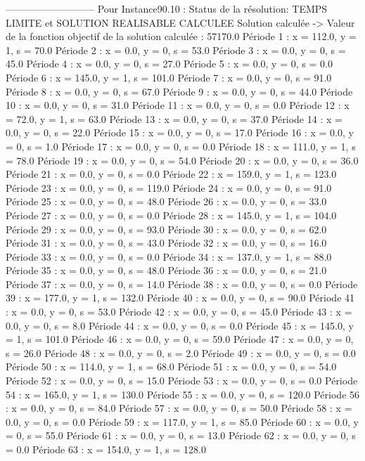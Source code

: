 ---------------------------
Pour Instance90.10 :
Status de la résolution: TEMPS LIMITE et SOLUTION REALISABLE CALCULEE
Solution calculée
-> Valeur de la fonction objectif de la solution calculée :  57170.0
Période 1 : x = 112.0, y = 1, s = 70.0
Période 2 : x = 0.0, y = 0, s = 53.0
Période 3 : x = 0.0, y = 0, s = 45.0
Période 4 : x = 0.0, y = 0, s = 27.0
Période 5 : x = 0.0, y = 0, s = 0.0
Période 6 : x = 145.0, y = 1, s = 101.0
Période 7 : x = 0.0, y = 0, s = 91.0
Période 8 : x = 0.0, y = 0, s = 67.0
Période 9 : x = 0.0, y = 0, s = 44.0
Période 10 : x = 0.0, y = 0, s = 31.0
Période 11 : x = 0.0, y = 0, s = 0.0
Période 12 : x = 72.0, y = 1, s = 63.0
Période 13 : x = 0.0, y = 0, s = 37.0
Période 14 : x = 0.0, y = 0, s = 22.0
Période 15 : x = 0.0, y = 0, s = 17.0
Période 16 : x = 0.0, y = 0, s = 1.0
Période 17 : x = 0.0, y = 0, s = 0.0
Période 18 : x = 111.0, y = 1, s = 78.0
Période 19 : x = 0.0, y = 0, s = 54.0
Période 20 : x = 0.0, y = 0, s = 36.0
Période 21 : x = 0.0, y = 0, s = 0.0
Période 22 : x = 159.0, y = 1, s = 123.0
Période 23 : x = 0.0, y = 0, s = 119.0
Période 24 : x = 0.0, y = 0, s = 91.0
Période 25 : x = 0.0, y = 0, s = 48.0
Période 26 : x = 0.0, y = 0, s = 33.0
Période 27 : x = 0.0, y = 0, s = 0.0
Période 28 : x = 145.0, y = 1, s = 104.0
Période 29 : x = 0.0, y = 0, s = 93.0
Période 30 : x = 0.0, y = 0, s = 62.0
Période 31 : x = 0.0, y = 0, s = 43.0
Période 32 : x = 0.0, y = 0, s = 16.0
Période 33 : x = 0.0, y = 0, s = 0.0
Période 34 : x = 137.0, y = 1, s = 88.0
Période 35 : x = 0.0, y = 0, s = 48.0
Période 36 : x = 0.0, y = 0, s = 21.0
Période 37 : x = 0.0, y = 0, s = 14.0
Période 38 : x = 0.0, y = 0, s = 0.0
Période 39 : x = 177.0, y = 1, s = 132.0
Période 40 : x = 0.0, y = 0, s = 90.0
Période 41 : x = 0.0, y = 0, s = 53.0
Période 42 : x = 0.0, y = 0, s = 45.0
Période 43 : x = 0.0, y = 0, s = 8.0
Période 44 : x = 0.0, y = 0, s = 0.0
Période 45 : x = 145.0, y = 1, s = 101.0
Période 46 : x = 0.0, y = 0, s = 59.0
Période 47 : x = 0.0, y = 0, s = 26.0
Période 48 : x = 0.0, y = 0, s = 2.0
Période 49 : x = 0.0, y = 0, s = 0.0
Période 50 : x = 114.0, y = 1, s = 68.0
Période 51 : x = 0.0, y = 0, s = 54.0
Période 52 : x = 0.0, y = 0, s = 15.0
Période 53 : x = 0.0, y = 0, s = 0.0
Période 54 : x = 165.0, y = 1, s = 130.0
Période 55 : x = 0.0, y = 0, s = 120.0
Période 56 : x = 0.0, y = 0, s = 84.0
Période 57 : x = 0.0, y = 0, s = 50.0
Période 58 : x = 0.0, y = 0, s = 0.0
Période 59 : x = 117.0, y = 1, s = 85.0
Période 60 : x = 0.0, y = 0, s = 55.0
Période 61 : x = 0.0, y = 0, s = 13.0
Période 62 : x = 0.0, y = 0, s = 0.0
Période 63 : x = 154.0, y = 1, s = 128.0
